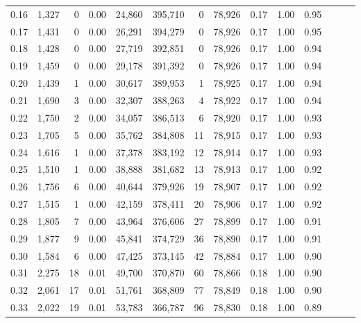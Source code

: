 \begin{tabular}{rrrrrrrrrrrrrr}
0.16 &   1,327 &      0 &  0.00 &   24,860 &  395,710 &       0 &  78,926 &  0.17 &  1.00 &      0.95 \\
0.17 &   1,431 &      0 &  0.00 &   26,291 &  394,279 &       0 &  78,926 &  0.17 &  1.00 &      0.95 \\
0.18 &   1,428 &      0 &  0.00 &   27,719 &  392,851 &       0 &  78,926 &  0.17 &  1.00 &      0.94 \\
0.19 &   1,459 &      0 &  0.00 &   29,178 &  391,392 &       0 &  78,926 &  0.17 &  1.00 &      0.94 \\
0.20 &   1,439 &      1 &  0.00 &   30,617 &  389,953 &       1 &  78,925 &  0.17 &  1.00 &      0.94 \\
0.21 &   1,690 &      3 &  0.00 &   32,307 &  388,263 &       4 &  78,922 &  0.17 &  1.00 &      0.94 \\
0.22 &   1,750 &      2 &  0.00 &   34,057 &  386,513 &       6 &  78,920 &  0.17 &  1.00 &      0.93 \\
0.23 &   1,705 &      5 &  0.00 &   35,762 &  384,808 &      11 &  78,915 &  0.17 &  1.00 &      0.93 \\
0.24 &   1,616 &      1 &  0.00 &   37,378 &  383,192 &      12 &  78,914 &  0.17 &  1.00 &      0.93 \\
0.25 &   1,510 &      1 &  0.00 &   38,888 &  381,682 &      13 &  78,913 &  0.17 &  1.00 &      0.92 \\
0.26 &   1,756 &      6 &  0.00 &   40,644 &  379,926 &      19 &  78,907 &  0.17 &  1.00 &      0.92 \\
0.27 &   1,515 &      1 &  0.00 &   42,159 &  378,411 &      20 &  78,906 &  0.17 &  1.00 &      0.92 \\
0.28 &   1,805 &      7 &  0.00 &   43,964 &  376,606 &      27 &  78,899 &  0.17 &  1.00 &      0.91 \\
0.29 &   1,877 &      9 &  0.00 &   45,841 &  374,729 &      36 &  78,890 &  0.17 &  1.00 &      0.91 \\
0.30 &   1,584 &      6 &  0.00 &   47,425 &  373,145 &      42 &  78,884 &  0.17 &  1.00 &      0.90 \\
0.31 &   2,275 &     18 &  0.01 &   49,700 &  370,870 &      60 &  78,866 &  0.18 &  1.00 &      0.90 \\
0.32 &   2,061 &     17 &  0.01 &   51,761 &  368,809 &      77 &  78,849 &  0.18 &  1.00 &      0.90 \\
0.33 &   2,022 &     19 &  0.01 &   53,783 &  366,787 &      96 &  78,830 &  0.18 &  1.00 &      0.89 \\

\end{tabular}
